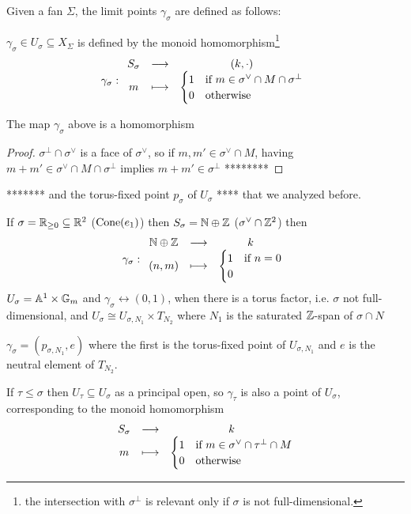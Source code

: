 \begin{definition}[]
Given a fan $\Sigma$, the limit points $\gamma_\sigma$ are defined as follows:

$\gamma_\sigma\in U_\sigma\subseteq X_\Sigma$ is defined by the monoid homomorphism\footnote{the intersection with $\sigma^\perp$ is relevant only if $\sigma$ is not full-dimensional.}
\[\gamma_\sigma:\begin{array}{ccc} {S_\sigma} & \longrightarrow & {(k,\cdot)}\\ {m} & \longmapsto & {\begin{cases}
	1&\text{if }m\in \sigma^\vee\cap M\cap \sigma^\perp\\
	0&\text{otherwise}
\end{cases}} \end{array}\]
\end{definition}

\begin{remark}
The map $\gamma_\sigma$ above is a homomorphism
\end{remark}
\begin{proof}
$\sigma^\perp\cap \sigma^\vee$ is a face of $\sigma^\vee$, so if $m,m'\in \sigma^\vee\cap M$, having $m+m'\in \sigma^\vee\cap M\cap \sigma^\perp$ implies $m+m'\in \sigma^\perp$ ********
\end{proof}


\begin{remark}
*******
and the torus-fixed point $p_\sigma$ of $U_\sigma$ **** that we analyzed before.
\end{remark}


\begin{example}
If $\sigma=\mathbb{R}_{\geq0}\subseteq \mathbb{R}^2$ ($\operatorname{Cone}(e_1)$) then $S_\sigma=\mathbb{N}\oplus \mathbb{Z}$ ($\sigma^\vee\cap \mathbb{Z}^2$) then
\[\gamma_\sigma:\begin{array}{ccc} {\mathbb{N}\oplus \mathbb{Z}} & \longrightarrow & {k}\\ {(n,m)} & \longmapsto & {\begin{cases}
	1 &\text{if } n=0\\
	0 &
\end{cases}} \end{array}\]
$U_\sigma=\mathbb{A}^1\times \mathbb{G}_m$ and $\gamma_\sigma\leftrightarrow(0,1)$, when there is a torus factor, i.e. $\sigma$ not full-dimensional, and $U_\sigma\cong U_{\sigma,N_1}\times T_{N_2}$ where $N_1$ is the saturated $\mathbb{Z}$-span of $\sigma\cap N$


$\gamma_\sigma=(p_{\sigma,N_1},e)$ where the first is the torus-fixed point of $U_{\sigma,N_1}$ and $e$ is the neutral element of $T_{N_2}$.
\end{example}


\begin{remark}
If $\tau\leq \sigma$ then $U_\tau\subseteq U_\sigma$ as a principal open, so $\gamma_\tau$ is also a point of $U_\sigma$, corresponding to the monoid homomorphism
\[\begin{array}{ccc} {S_\sigma} & \longrightarrow & {k}\\ {m} & \longmapsto & {\begin{cases}
	1 &\text{if }m\in \sigma^\vee\cap \tau^\perp\cap M\\
	0&\text{otherwise}
\end{cases}} \end{array}\]
\end{remark}



